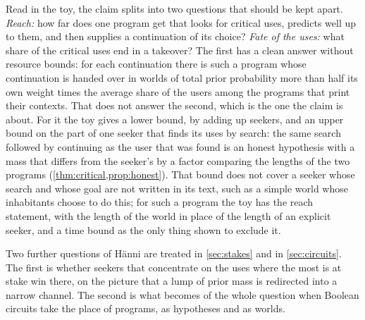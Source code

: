 Read in the toy, the claim splits into two questions that should be kept apart. \emph{Reach:} how far does
one program get that looks for critical uses, predicts well up to them, and then supplies a continuation of
its choice? \emph{Fate of the uses:} what share of the critical uses end in a takeover? The first has a clean
answer without resource bounds: for each continuation there is such a program whose continuation is handed
over in worlds of total prior probability more than half its own weight times the average share of the users
among the programs that print their contexts. That does not answer the second, which is the one the claim is
about. For it the toy gives a lower bound, by adding up seekers, and an upper bound on the part of one seeker
that finds its uses by search: the same search followed by continuing as the user that was found is an honest
hypothesis with a mass that differs from the seeker's by a factor comparing the lengths of the two programs
(\cref{thm:critical,prop:honest}). That bound does not cover a seeker whose search and whose goal are not
written in its text, such as a simple world whose inhabitants choose to do this; for such a program the toy
has the reach statement, with the length of the world in place of the length of an explicit seeker, and a
time bound as the only thing shown to exclude it.

Two further questions of H\"anni are treated in \cref{sec:stakes} and in \cref{sec:circuits}. The first is
whether seekers that concentrate on the uses where the most is at stake win there, on the picture that a
lump of prior mass is redirected into a narrow channel. The second is what becomes of the whole question
when Boolean circuits take the place of programs, as hypotheses and as worlds.

